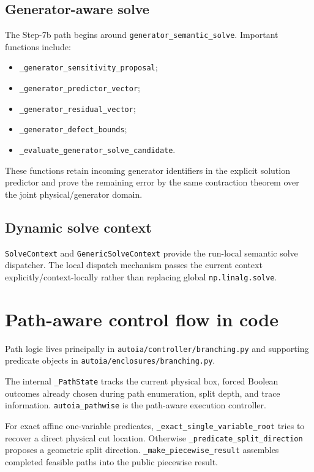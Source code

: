 \documentclass[11pt]{article}
\newcommand{\codepath}[1]{\nolinkurl{#1}}
\begin{document}
\subsection{Generator-aware solve}

The Step-7b path begins around
\texttt{generator\_semantic\_solve}.  Important functions include:
\begin{itemize}[leftmargin=*]
\item \texttt{\_generator\_sensitivity\_proposal};
\item \texttt{\_generator\_predictor\_vector};
\item \texttt{\_generator\_residual\_vector};
\item \texttt{\_generator\_defect\_bounds};
\item \texttt{\_evaluate\_generator\_solve\_candidate}.
\end{itemize}
These functions retain incoming generator identifiers in the explicit solution
predictor and prove the remaining error by the same contraction theorem over the
joint physical/generator domain.

\subsection{Dynamic solve context}

\texttt{SolveContext} and \texttt{GenericSolveContext} provide the run-local
semantic solve dispatcher.  The local dispatch mechanism passes the current
context explicitly/context-locally rather than replacing global
\texttt{np.linalg.solve}.

\section{Path-aware control flow in code}

Path logic lives principally in \codepath{autoia/controller/branching.py} and
supporting predicate objects in \codepath{autoia/enclosures/branching.py}.

The internal \texttt{\_PathState} tracks the current physical box, forced
Boolean outcomes already chosen during path enumeration, split depth, and trace
information.  \texttt{autoia\_pathwise} is the path-aware execution controller.

For exact affine one-variable predicates, \texttt{\_exact\_single\_variable\_root}
tries to recover a direct physical cut location.  Otherwise
\texttt{\_predicate\_split\_direction} proposes a geometric split direction.
\texttt{\_make\_piecewise\_result} assembles completed feasible paths into the
public piecewise result.
\end{document}
